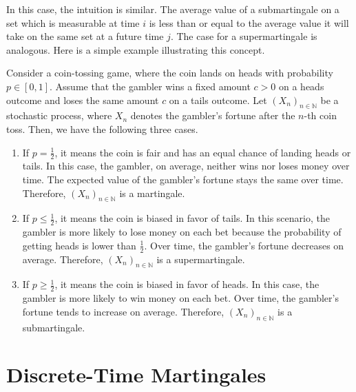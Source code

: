 In this case, the intuition is similar. The average value of a submartingale on a set which is measurable at time $i$ is less than or equal to the average value it will take on the same set at a future time $j$. The case for a supermartingale is analogous. Here is a simple example illustrating this concept.

\begin{example}
Consider a coin-tossing game, where the coin lands on heads with probability $p \in [0,1]$. Assume that the gambler wins a fixed amount $c > 0$ on a heads outcome and loses the same amount $c$ on a tails outcome. Let $(X_n)_{n \in \mathbb{N}}$ be a stochastic process, where $X_n$ denotes the gambler's fortune after the $n$-th coin toss. Then, we have the following three cases.
\begin{enumerate}
\item If $p = \frac{1}{2}$, it means the coin is fair and has an equal chance of landing heads or tails. In this case, the gambler, on average, neither wins nor loses money over time. The expected value of the gambler's fortune stays the same over time. Therefore, $(X_n)_{n \in \mathbb{N}}$ is a martingale. \\
\item If $p \le \frac{1}{2}$, it means the coin is biased in favor of tails. In this scenario, the gambler is more likely to lose money on each bet because the probability of getting heads is lower than $\frac{1}{2}$. Over time, the gambler's fortune decreases on average. Therefore, $(X_n)_{n \in \mathbb{N}}$ is a supermartingale.\\
\item If $p \ge \frac{1}{2}$, it means the coin is biased in favor of heads. In this case, the gambler is more likely to win money on each bet. Over time, the gambler's fortune tends to increase on average. Therefore, $(X_n)_{n \in \mathbb{N}}$ is a submartingale.
\end{enumerate}
\end{example}

\section{Discrete-Time Martingales}
